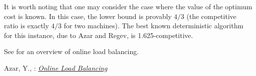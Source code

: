 \documentclass{article}
\begin{document}
It is worth noting that one may consider the case where the value
of the optimum cost is known. In this case, the lower bound is
provably $4/3$ (the competitive ratio is exactly $4/3$ for two
machines). The best known deterministic algorithm for this
instance, due to Azar and Regev, is 1.625-competitive.

See \cite{azar97line} for an overview of online load balancing.


\begin{thebibliography}{9}
 Azar, Y., : \href{http://www.cs.tau.ac.il/~azar/survey.ps}{\emph{Online Load Balancing}}
\end{thebibliography}
\end{document}
